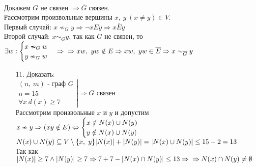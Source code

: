 \documentclass[12pt, letterpaper, twoside]{article}
\begin{document}
        \\
        Докажем $G$ не связен $\Rightarrow \overline{G}$ связен.\\
        Рассмотрим произвольные вершины $x,\ y\ (x\neq y) \in V$.\\
        Первый случай: $x \nsim_G y \Rightarrow \neg xEy\Rightarrow x\overline{E}y$\\
        Второй случай: $x \sim_G y$, так как $G$ не связен, то $\exists w: \begin{cases}
            x \nsim_G w\\
            y \nsim_G w
        \end{cases}\Rightarrow\\ \Rightarrow xw,\ yw \notin E\Rightarrow xw,\ yw \in \overline{E}\Rightarrow x \sim_{\overline{G}} y$ 
        \begin{enumerate}\newpage
            \item[11.] Доказать:\\
            $\left. \begin{matrix}
                (n,\ m)\text{ - граф }G\\
                n = 15\\
                \forall x\ d(x) \geq 7
            \end{matrix} \right|\Rightarrow G\text{ связен} $\\
            Рассмотрим произвольные $x$ и $y$ и допустим $x\nsim y\Rightarrow (xy \notin E)\\
            \Leftrightarrow \begin{cases}
                x \notin N(x) \cup N(y)\\
                y \notin N(x) \cup N(y)
            \end{cases}$\\
            $N(x) \cup N(y) \subseteq V\setminus \{x,\ y\}\\
            |N(x)| + |N(y)| = |N(x) \cup N(y)|\leq 15 - 2 = 13$\\
            Так как $|N(x)| \geq 7 \wedge |N(y)| \geq 7\Rightarrow 7 + 7 - |N(x) \cap N(y)|\leq 13\Rightarrow\\
            \Rightarrow N(x)\cap N(y)\neq \emptyset$
        \end{enumerate}
\end{document}
